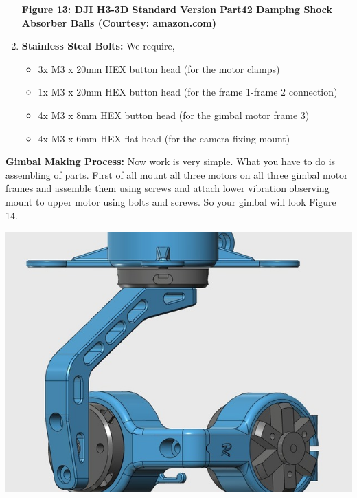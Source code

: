 \documentclass[11pt,a4paper]{article}
\begin{document}
\begin{enumerate}
\begin{center}
			\end{center}
			\begin{center}
				\textbf{Figure 13: DJI H3-3D Standard Version Part42 Damping Shock Absorber Balls (Courtesy: amazon.com)}
			\end{center}
			\item \textbf{Stainless Steal Bolts:} We require,
			\begin{itemize}
				\item 3x M3 x 20mm HEX button head (for the motor clamps)
				\item 1x M3 x 20mm HEX button head (for the frame 1-frame 2 connection)
				\item 4x M3 x 8mm HEX button head (for the gimbal motor frame 3)
				\item 4x M3 x 6mm HEX flat head (for the camera fixing mount)
			\end{itemize}
		\end{enumerate}
		\textbf{Gimbal Making Process:}
		\newline
		Now work is very simple. What you have to do is assembling of parts. First of all mount all three motors on all three gimbal motor frames and assemble them using screws and attach lower vibration observing mount to upper motor using bolts and screws. So your gimbal will look Figure 14.
		\begin{center}
			\includegraphics[scale=0.5]{gimbal_making_phase_1.jpg}
		\end{center}
\end{document}
